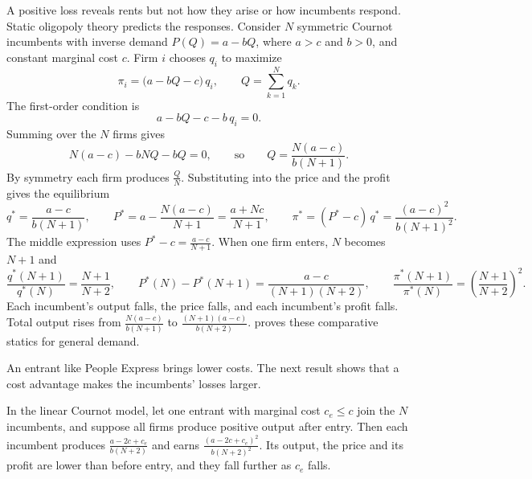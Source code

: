 A positive loss reveals rents but not how they arise or how incumbents respond. Static oligopoly theory
predicts the responses. Consider $N$ symmetric Cournot incumbents with inverse demand $P(Q) = a - bQ$, where
$a > c$ and $b > 0$, and constant marginal cost $c$. Firm $i$ chooses $q_i$ to maximize
\begin{equation*}
  \pi_i = \big(a - bQ - c\big)\,q_i, \qquad Q = \sum_{k=1}^N q_k .
\end{equation*}
The first-order condition is
\begin{equation*}
  a - bQ - c - b\,q_i = 0 .
\end{equation*}
Summing over the $N$ firms gives
\begin{equation*}
  N(a - c) - bNQ - bQ = 0, \qquad\text{so}\qquad Q = \frac{N(a-c)}{b(N+1)} .
\end{equation*}
By symmetry each firm produces $\frac{Q}{N}$. Substituting into the price and the profit gives the equilibrium
\begin{equation}\label{eq:09-cournot-entry}
  q^* = \frac{a-c}{b(N+1)}, \qquad
  P^* = a - \frac{N(a-c)}{N+1} = \frac{a + Nc}{N+1}, \qquad
  \pi^* = (P^* - c)\,q^* = \frac{(a-c)^2}{b(N+1)^2}.
\end{equation}
The middle expression uses $P^* - c = \frac{a-c}{N+1}$. When one firm enters, $N$ becomes $N+1$ and
\begin{equation*}
  \frac{q^*(N+1)}{q^*(N)} = \frac{N+1}{N+2}, \qquad
  P^*(N) - P^*(N+1) = \frac{a-c}{(N+1)(N+2)}, \qquad
  \frac{\pi^*(N+1)}{\pi^*(N)} = \left(\frac{N+1}{N+2}\right)^2 .
\end{equation*}
Each incumbent's output falls, the price falls, and each incumbent's profit falls. Total output rises from
$\frac{N(a-c)}{b(N+1)}$ to $\frac{(N+1)(a-c)}{b(N+2)}$.  proves these comparative statics
for general demand.

An entrant like People Express brings lower costs. The next result shows that a cost advantage makes the
incumbents' losses larger.

\begin{proposition}\label{prop:09-cournot-entrant}
In the linear Cournot model, let one entrant with marginal cost $c_e \le c$ join the $N$ incumbents, and
suppose all firms produce positive output after entry. Then each incumbent produces
$\frac{a - 2c + c_e}{b(N+2)}$ and earns $\frac{(a - 2c + c_e)^2}{b(N+2)^2}$. Its output, the price and its
profit are lower than before entry, and they fall further as $c_e$ falls.
\end{proposition}

